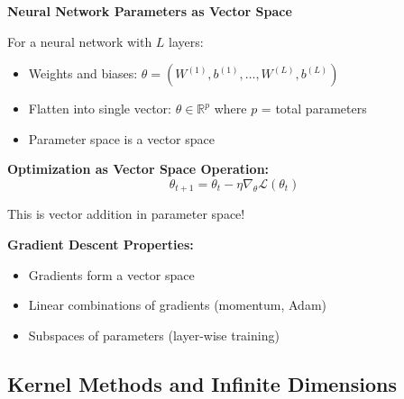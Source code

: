 \documentclass[12pt,a4paper]{article}
\theoremstyle{definition}
\begin{document}
\begin{tcolorbox}[enhanced,breakable,colback=orange!5!white,colframe=orange!75!black,title=Parameter Space in Deep Learning]
\textbf{Neural Network Parameters as Vector Space}

For a neural network with $L$ layers:
\begin{itemize}
    \item Weights and biases: $\theta = (W^{(1)}, b^{(1)}, \ldots, W^{(L)}, b^{(L)})$
    \item Flatten into single vector: $\theta \in \mathbb{R}^p$ where $p$ = total parameters
    \item Parameter space is a vector space
\end{itemize}

\textbf{Optimization as Vector Space Operation:}
\begin{equation}
\theta_{t+1} = \theta_t - \eta \nabla_\theta \mathcal{L}(\theta_t)
\end{equation}

This is vector addition in parameter space!

\textbf{Gradient Descent Properties:}
\begin{itemize}
    \item Gradients form a vector space
    \item Linear combinations of gradients (momentum, Adam)
    \item Subspaces of parameters (layer-wise training)
\end{itemize}
\end{tcolorbox}

\subsection{Kernel Methods and Infinite Dimensions}
\end{document}
